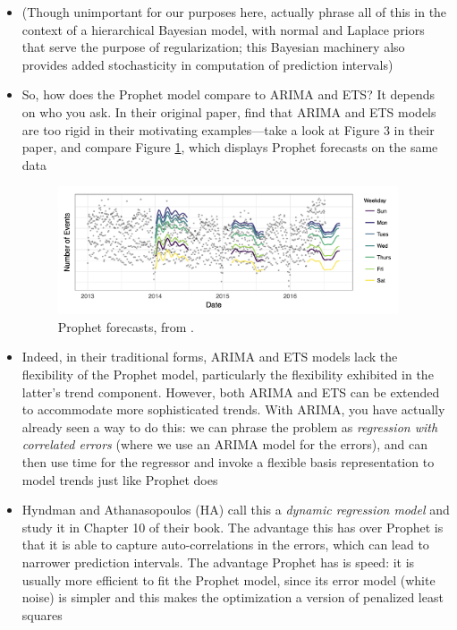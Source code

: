 \documentclass{article}
\begin{document}
\begin{itemize}
\item (Though unimportant for our purposes here, \citet{taylor2018forecasting}
  actually phrase all of this in the context of a hierarchical Bayesian model,
  with normal and Laplace priors that serve the purpose of regularization;  
  this Bayesian machinery also provides added stochasticity in computation of 
  prediction intervals) 

\item So, how does the Prophet model compare to ARIMA and ETS? It depends on who
  you ask. In their original paper, \citet{taylor2018forecasting} find that
  ARIMA and ETS models are too rigid in their motivating examples---take a look
  at Figure 3 in their paper, and compare Figure \ref{fig:prophet}, which
  displays Prophet forecasts on the same data

\begin{figure}[htb]
\centering
\includegraphics[width=0.95\textwidth]{prophet.png}
\caption{Prophet forecasts, from \citet{taylor2018forecasting}.}
\label{fig:prophet}
\end{figure}

\item Indeed, in their traditional forms, ARIMA and ETS models lack the
  flexibility of the Prophet model, particularly the flexibility exhibited in
  the latter's trend component. However, both ARIMA and ETS can be extended to
  accommodate more sophisticated trends. With ARIMA, you have actually already
  seen a way to do this: we can phrase the problem as \emph{regression with
    correlated errors} (where we use an ARIMA model for the errors), and can
  then use time for the regressor and invoke a flexible basis representation to
  model trends just like Prophet does    

\item Hyndman and Athanasopoulos (HA) call this a \emph{dynamic regression
    model} and study it in Chapter 10 of their book. The advantage this has over 
  Prophet is that it is able to capture auto-correlations in the errors, which
  can lead to narrower prediction intervals. The advantage Prophet has is speed:
  it is usually more efficient to fit the Prophet model, since its error model
  (white noise) is simpler and this makes the optimization a version of
  penalized least squares  
\end{itemize}
\end{document}
